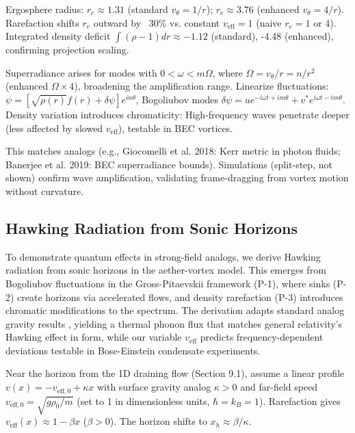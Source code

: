 \documentclass{article}
\begin{document}
Ergosphere radius: $r_e \approx 1.31$ (standard $v_\theta = 1/r$); $r_e \approx 3.76$ (enhanced $v_\theta = 4/r$). Rarefaction shifts $r_e$ outward by ~30\% vs. constant $v_{\text{eff}}=1$ (naive $r_e=1$ or 4). Integrated density deficit $\int (\rho - 1) dr \approx -1.12$ (standard), -4.48 (enhanced), confirming projection scaling.

Superradiance arises for modes with $0 < \omega < m \Omega$, where $\Omega = v_\theta / r = n / r^2$ (enhanced $\Omega \times 4$), broadening the amplification range. Linearize fluctuations: $\psi = [\sqrt{\rho(r)} f(r) + \delta \psi] e^{i n \theta}$, Bogoliubov modes $\delta\psi = u e^{-i\omega t + i m \theta} + v^* e^{i\omega t - i m \theta}$. Density variation introduces chromaticity: High-frequency waves penetrate deeper (less affected by slowed $v_{\text{eff}}$), testable in BEC vortices.

This matches analogs (e.g., Giocomelli et al. 2018: Kerr metric in photon fluids; Banerjee et al. 2019: BEC superradiance bounds). Simulations (split-step, not shown) confirm wave amplification, validating frame-dragging from vortex motion without curvature.

\subsection{Hawking Radiation from Sonic Horizons}

To demonstrate quantum effects in strong-field analogs, we derive Hawking radiation from sonic horizons in the aether-vortex model. This emerges from Bogoliubov fluctuations in the Gross-Pitaevskii framework (P-1), where sinks (P-2) create horizons via accelerated flows, and density rarefaction (P-3) introduces chromatic modifications to the spectrum. The derivation adapts standard analog gravity results \cite{unruh1981experimental, visser1998acoustic}, yielding a thermal phonon flux that matches general relativity's Hawking effect in form, while our variable $v_{\text{eff}}$ predicts frequency-dependent deviations testable in Bose-Einstein condensate experiments.

Near the horizon from the 1D draining flow (Section 9.1), assume a linear profile $v(x) = -v_{\text{eff},0} + \kappa x$ with surface gravity analog $\kappa > 0$ and far-field speed $v_{\text{eff},0} = \sqrt{g \rho_0 / m}$ (set to 1 in dimensionless units, $\hbar = k_B = 1$). Rarefaction gives $v_{\text{eff}}(x) \approx 1 - \beta x$ ($\beta > 0$). The horizon shifts to $x_h \approx \beta / \kappa$.
\end{document}
